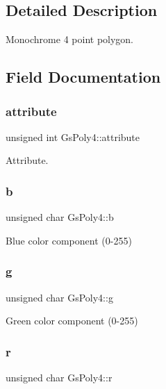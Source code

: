 \subsection{Detailed Description}
Monochrome 4 point polygon. 

\subsection{Field Documentation}
\mbox{\label{structGsPoly4_ad58474b481cf8e41873f003916501985}} 
\subsubsection{\texorpdfstring{attribute}{attribute}}
{\footnotesize\ttfamily unsigned int Gs\+Poly4\+::attribute}



Attribute. 

\mbox{\label{structGsPoly4_ac720646ffe072a66a671f937b0d0ff26}} 
\subsubsection{\texorpdfstring{b}{b}}
{\footnotesize\ttfamily unsigned char Gs\+Poly4\+::b}



Blue color component (0-\/255) 

\mbox{\label{structGsPoly4_ad70029bd2ddc16663cee9e48c44bb290}} 
\subsubsection{\texorpdfstring{g}{g}}
{\footnotesize\ttfamily unsigned char Gs\+Poly4\+::g}



Green color component (0-\/255) 

\mbox{\label{structGsPoly4_a80a1e6da3f60059a0de5d35b3c362b39}} 
\subsubsection{\texorpdfstring{r}{r}}
{\footnotesize\ttfamily unsigned char Gs\+Poly4\+::r}



